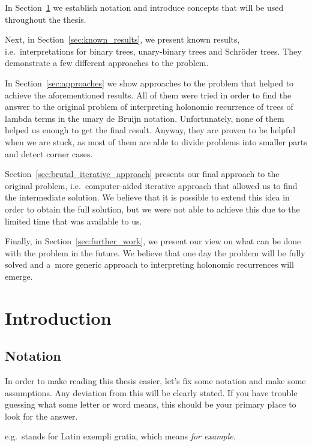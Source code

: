 \documentclass[final]{article}
\theoremstyle{definition}
\theoremstyle{definition}
\theoremstyle{remark}
\begin{document}
In Section~\ref{sec:introduction} we establish notation and introduce concepts that will be used throughout the thesis.

Next, in Section~\ref{sec:known_results}, we present known results, i.e.~interpretations for binary trees, unary-binary trees and Schröder trees. They demonstrate a few different approaches to the problem.

In Section~\ref{sec:approaches} we show approaches to the problem that helped to achieve the aforementioned results. All of them were tried in order to find the answer to the original problem of interpreting holonomic recurrence of trees of lambda terms in the unary de Bruijn notation. Unfortunately, none of them helped us enough to get the final result. Anyway, they are proven to be helpful when we are stuck, as most of them are able to divide problems into smaller parts and detect corner cases.

Section~\ref{sec:brutal_iterative_approach} presents our final approach to the original problem, i.e.~computer-aided iterative approach that allowed us to find the intermediate solution. We believe that it is possible to extend this idea in order to obtain the full solution, but we were not able to achieve this due to the limited time that was available to us.

Finally, in Section~\ref{sec:further_work}, we present our view on what can be done with the problem in the future. We believe that one day the problem will be fully solved and a~more generic approach to interpreting holonomic recurrences will emerge.

\clearpage

\section{Introduction}%
\label{sec:introduction}

\subsection{Notation}%
\label{sub:notation}

In order to make reading this thesis easier, let's fix some notation and make some assumptions. Any deviation from this will be clearly stated. If you have trouble guessing what some letter or word means, this should be your primary place to look for the answer.

e.g.~stands for Latin exempli gratia, which means \textit{for example}.
\end{document}
